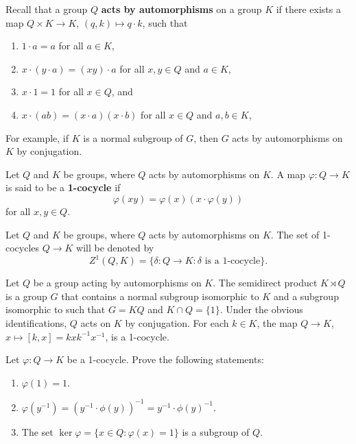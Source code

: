 Recall that a group $Q$ \textbf{acts by automorphisms} on a group $K$ if 
there exists a map $Q\times K\to K$, $(q,k)\mapsto q\cdot k$, 
such that 
\begin{enumerate}
    \item $1\cdot a=a$ for all $a\in K$, 
    \item $x\cdot (y\cdot a)=(xy)\cdot a$ for all $x,y\in Q$ and $a\in K$, 
    \item $x\cdot 1=1$ for all $x\in Q$, and 
    \item $x\cdot (ab)=(x\cdot a)(x\cdot b)$ for all $x\in Q$ and $a,b\in K$, 
\end{enumerate}
For example, if $K$ is a normal subgroup of $G$, 
then $G$ acts by automorphisms on $K$ by conjugation. 

\begin{definition}
Let $Q$ and $K$ be groups, where $Q$ acts by automorphisms on $K$. 
A map 
$\varphi\colon Q\to K$ is said to be a \textbf{1-cocycle} if 
\[
	\varphi(xy)=\varphi(x)(x\cdot\varphi(y))
\]
for all $x,y\in Q$.  
\end{definition}

Let $Q$ and $K$ be groups, where $Q$ acts by automorphisms on $K$. 
The set of 1-cocycles $Q\to K$ will be denoted by 
\[
Z^1(Q,K)=\{\delta\colon Q\to K:\text{$\delta$ is a 1-cocycle}\}.
\]

\begin{example}
Let $Q$ be a group acting by automorphisms on $K$. 
The semidirect product $K\rtimes Q$ 
is a group $G$ that contains a normal subgroup isomorphic to $K$ 
and a subgroup isomorphic to such that 
$G=KQ$ and $K\cap Q=\{1\}$. Under the obvious identifications, 
$Q$ acts on $K$ by conjugation. For each $k\in K$, the map 
$Q\to K$, $x\mapsto [k,x]=kxk^{-1}x^{-1}$, is a 1-cocycle. 
\end{example}

\begin{exercise}
\label{xca:1cocycle}
Let $\varphi\colon Q\to K$ be a 1-cocycle. Prove the following statements:
\begin{enumerate}
	\item $\varphi(1)=1$.
	\item $\varphi(y^{-1})=(y^{-1}\cdot\phi(y))^{-1}=y^{-1}\cdot\phi(y)^{-1}$.
	\item The set $\ker\varphi=\{x\in Q:\varphi(x)=1\}$ is a subgroup of $Q$. 
\end{enumerate}
\end{exercise}

